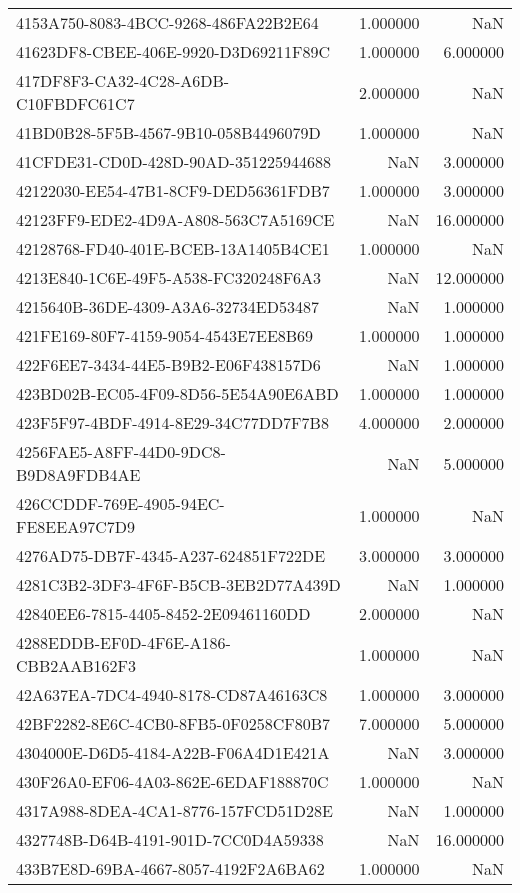 \begin{tabular}{lrr}
4153A750-8083-4BCC-9268-486FA22B2E64 & 1.000000 & NaN \\
41623DF8-CBEE-406E-9920-D3D69211F89C & 1.000000 & 6.000000 \\
417DF8F3-CA32-4C28-A6DB-C10FBDFC61C7 & 2.000000 & NaN \\
41BD0B28-5F5B-4567-9B10-058B4496079D & 1.000000 & NaN \\
41CFDE31-CD0D-428D-90AD-351225944688 & NaN & 3.000000 \\
42122030-EE54-47B1-8CF9-DED56361FDB7 & 1.000000 & 3.000000 \\
42123FF9-EDE2-4D9A-A808-563C7A5169CE & NaN & 16.000000 \\
42128768-FD40-401E-BCEB-13A1405B4CE1 & 1.000000 & NaN \\
4213E840-1C6E-49F5-A538-FC320248F6A3 & NaN & 12.000000 \\
4215640B-36DE-4309-A3A6-32734ED53487 & NaN & 1.000000 \\
421FE169-80F7-4159-9054-4543E7EE8B69 & 1.000000 & 1.000000 \\
422F6EE7-3434-44E5-B9B2-E06F438157D6 & NaN & 1.000000 \\
423BD02B-EC05-4F09-8D56-5E54A90E6ABD & 1.000000 & 1.000000 \\
423F5F97-4BDF-4914-8E29-34C77DD7F7B8 & 4.000000 & 2.000000 \\
4256FAE5-A8FF-44D0-9DC8-B9D8A9FDB4AE & NaN & 5.000000 \\
426CCDDF-769E-4905-94EC-FE8EEA97C7D9 & 1.000000 & NaN \\
4276AD75-DB7F-4345-A237-624851F722DE & 3.000000 & 3.000000 \\
4281C3B2-3DF3-4F6F-B5CB-3EB2D77A439D & NaN & 1.000000 \\
42840EE6-7815-4405-8452-2E09461160DD & 2.000000 & NaN \\
4288EDDB-EF0D-4F6E-A186-CBB2AAB162F3 & 1.000000 & NaN \\
42A637EA-7DC4-4940-8178-CD87A46163C8 & 1.000000 & 3.000000 \\
42BF2282-8E6C-4CB0-8FB5-0F0258CF80B7 & 7.000000 & 5.000000 \\
4304000E-D6D5-4184-A22B-F06A4D1E421A & NaN & 3.000000 \\
430F26A0-EF06-4A03-862E-6EDAF188870C & 1.000000 & NaN \\
4317A988-8DEA-4CA1-8776-157FCD51D28E & NaN & 1.000000 \\
4327748B-D64B-4191-901D-7CC0D4A59338 & NaN & 16.000000 \\
433B7E8D-69BA-4667-8057-4192F2A6BA62 & 1.000000 & NaN \\

\end{tabular}
